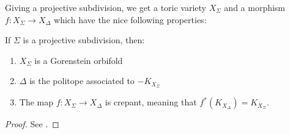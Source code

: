\documentclass[../main.tex]{subfiles}
\begin{document}
Giving a projective subdivision, we get a toric variety $X_\Sigma$ and a morphism $f \colon  X_\Sigma \to X_\Delta$ which have the nice following properties:
\begin{lemma} 
    If  $\Sigma$ is a projective subdivision, then:
    \begin{enumerate}
        \item $ X_\Sigma$ is a Gorenstein orbifold
        \item $\Delta$ is the politope associated to $-K_{X_\Sigma}$
        \item The map  $f \colon  X_\Sigma \to X_\Delta$ is crepant, meaning that $f^*(K_{X_\Delta})=K_{X_\Sigma}$.
    \end{enumerate}
\end{lemma}
\begin{proof} See \cite[Lemma 4.1.2]{CK99}.
\end{proof}
\end{document}
